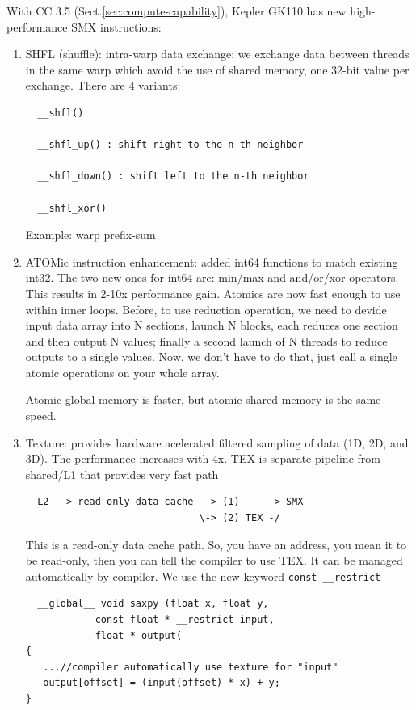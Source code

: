 With CC 3.5 (Sect.\ref{sec:compute-capability}), Kepler GK110 has new
high-performance SMX instructions:
\begin{enumerate}
  \item SHFL (shuffle): intra-warp data exchange: we exchange data between
  threads in the same warp which avoid the use of shared memory, one 32-bit
  value per exchange. There are 4 variants: 
  \begin{verbatim}
  __shfl()
  
  __shfl_up() : shift right to the n-th neighbor
  
  __shfl_down() : shift left to the n-th neighbor
  
  __shfl_xor()
  \end{verbatim}
  Example: warp prefix-sum
  
  \item ATOMic instruction enhancement: added int64 functions to match existing
  int32. The two new ones for int64 are: min/max and and/or/xor operators.
  This results in 2-10x performance gain. Atomics are now fast enough to use
  within inner loops. Before, to use reduction operation, we need to devide
  input data array into N sections, launch N blocks, each reduces one section
  and then output N values; finally a second launch of N threads to reduce
  outputs to a single values. Now, we don't have to do that, just call a single
  atomic operations on your whole array. 

Atomic global memory is faster, but atomic shared memory is the same speed. 

  \item Texture: provides hardware acelerated filtered sampling of data (1D, 2D,
  and 3D). The performance increases with 4x. TEX is separate pipeline from
  shared/L1 that provides very fast path
  \begin{verbatim}
  L2 --> read-only data cache --> (1) -----> SMX
                              \-> (2) TEX -/
  \end{verbatim}
 This is a read-only data cache path. So, you have an address, you mean it to be
 read-only, then you can tell the  compiler to use TEX. It can be managed
 automatically by compiler. We use the  new keyword \verb!const __restrict!
  \begin{verbatim}
  __global__ void saxpy (float x, float y, 
            const float * __restrict input, 
            float * output(
{
   ...//compiler automatically use texture for "input"
   output[offset] = (input(offset) * x) + y;
}
  \end{verbatim}
  

\end{enumerate}
